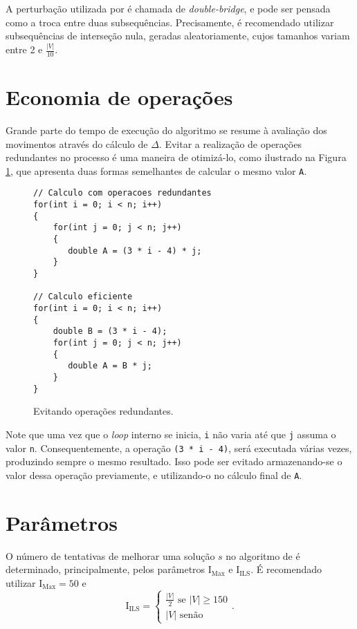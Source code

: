 A perturbação utilizada por \cite{SILVA2012513} é chamada de \textit{double-bridge}, e pode ser pensada como a troca entre duas subsequências. Precisamente, é recomendado utilizar subsequências de interseção nula, geradas aleatoriamente, cujos tamanhos variam entre 2 e \(\frac{|V|}{10}\).

\section{Economia de operações}

Grande parte do tempo de execução do algoritmo se resume à avaliação dos movimentos através do cálculo de \(\Delta\). Evitar a realização de operações redundantes no processo é uma maneira de otimizá-lo, como ilustrado na Figura \ref{deltaCarroca}, que apresenta duas formas semelhantes de calcular o mesmo valor \texttt{A}.

\begin{figure}[!htbp]
    \centering
    \begin{lstlisting}
// Calculo com operacoes redundantes
for(int i = 0; i < n; i++)
{
    for(int j = 0; j < n; j++)
    {
       double A = (3 * i - 4) * j;
    }
}

// Calculo eficiente
for(int i = 0; i < n; i++)
{
    double B = (3 * i - 4);
    for(int j = 0; j < n; j++)
    {
       double A = B * j;
    }
}
    \end{lstlisting}
    \caption{Evitando operações redundantes.}
    \label{deltaCarroca}
\end{figure}

 Note que uma vez que o \textit{loop} interno se inicia, \texttt{i} não varia até que \texttt{j} assuma o valor \texttt{n}. Consequentemente, a operação \texttt{(3 * i - 4)}, será executada várias vezes, produzindo sempre o mesmo resultado. Isso pode ser evitado armazenando-se o valor dessa operação previamente, e utilizando-o no cálculo final de \texttt{A}.

\section{Parâmetros}
O número de tentativas de melhorar uma solução \(s\) no algoritmo de \cite{SILVA2012513} é determinado, principalmente, pelos parâmetros \(\text{I}_{\text{Max}}\) e \(\text{I}_\text{ILS}\). É recomendado utilizar \(\text{I}_{\text{Max}} = 50\) e \[\text{I}_\text{ILS} = \begin{cases}\frac{|V|}{2} \text{ se } |V| \geq 150 \\
            |V| \text{ senão}
            \end{cases}.\]
            
